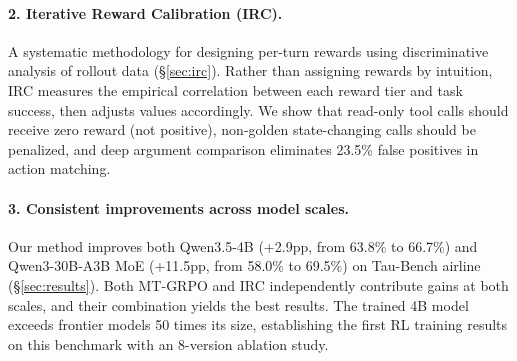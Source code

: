 \documentclass[11pt]{article}
\newcommand{\irc}{\textsc{IRC}}
\begin{document}
\paragraph{2. Iterative Reward Calibration (\irc{}).} A systematic methodology for designing per-turn rewards using discriminative analysis of rollout data (\S\ref{sec:irc}). Rather than assigning rewards by intuition, \irc{} measures the empirical correlation between each reward tier and task success, then adjusts values accordingly. We show that read-only tool calls should receive zero reward (not positive), non-golden state-changing calls should be penalized, and deep argument comparison eliminates 23.5\% false positives in action matching.

\paragraph{3. Consistent improvements across model scales.} Our method improves both Qwen3.5-4B (+2.9pp, from 63.8\% to 66.7\%) and Qwen3-30B-A3B MoE (+11.5pp, from 58.0\% to 69.5\%) on Tau-Bench airline (\S\ref{sec:results}). Both MT-GRPO and \irc{} independently contribute gains at both scales, and their combination yields the best results. The trained 4B model exceeds frontier models 50 times its size, establishing the first RL training results on this benchmark with an 8-version ablation study.

\end{document}
